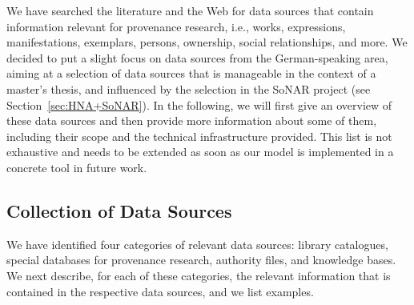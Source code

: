 We have searched the literature and the Web for data sources that contain information
relevant for provenance research, i.e., works, expressions, manifestations, exemplars,
persons, ownership, social relationships, and more. 
We decided to put a slight focus on data sources from the German-speaking area, 
aiming at a selection of data sources that is manageable in the context of a master's thesis,
and influenced by the selection in the \gls{SoNAR} project (see Section~\ref{sec:HNA+SoNAR}).
In the following, we will first give an overview of these data sources
and then provide more information about some of them,
including their scope and the technical infrastructure provided.
This list is not exhaustive and needs to be extended
as soon as our model is implemented in a concrete tool in future work.

\subsection{Collection of Data Sources}

We have identified four categories of relevant data sources:
library catalogues, special databases for provenance research, authority files, and knowledge bases.
We next describe, for each of these categories, the relevant information that is
contained in the respective data sources, and we list examples.

